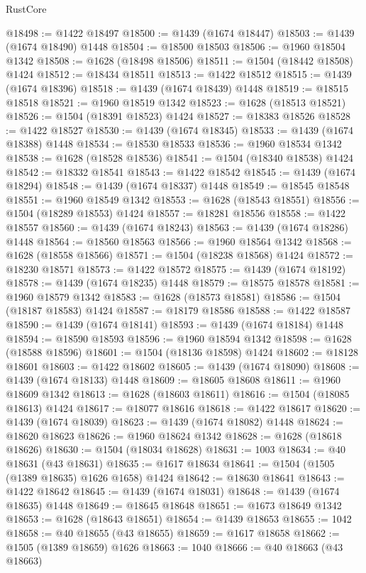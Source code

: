 \begin{lexlean}{RustCore}
\begin{coremodule}
@18498 := @1422 @18497
@18500 := @1439 (@1674 @18447)
@18503 := @1439 (@1674 @18490) @1448
@18504 := @18500 @18503
@18506 := @1960 @18504 @1342
@18508 := @1628 (@18498 @18506)
@18511 := @1504 (@18442 @18508) @1424
@18512 := @18434 @18511
@18513 := @1422 @18512
@18515 := @1439 (@1674 @18396)
@18518 := @1439 (@1674 @18439) @1448
@18519 := @18515 @18518
@18521 := @1960 @18519 @1342
@18523 := @1628 (@18513 @18521)
@18526 := @1504 (@18391 @18523) @1424
@18527 := @18383 @18526
@18528 := @1422 @18527
@18530 := @1439 (@1674 @18345)
@18533 := @1439 (@1674 @18388) @1448
@18534 := @18530 @18533
@18536 := @1960 @18534 @1342
@18538 := @1628 (@18528 @18536)
@18541 := @1504 (@18340 @18538) @1424
@18542 := @18332 @18541
@18543 := @1422 @18542
@18545 := @1439 (@1674 @18294)
@18548 := @1439 (@1674 @18337) @1448
@18549 := @18545 @18548
@18551 := @1960 @18549 @1342
@18553 := @1628 (@18543 @18551)
@18556 := @1504 (@18289 @18553) @1424
@18557 := @18281 @18556
@18558 := @1422 @18557
@18560 := @1439 (@1674 @18243)
@18563 := @1439 (@1674 @18286) @1448
@18564 := @18560 @18563
@18566 := @1960 @18564 @1342
@18568 := @1628 (@18558 @18566)
@18571 := @1504 (@18238 @18568) @1424
@18572 := @18230 @18571
@18573 := @1422 @18572
@18575 := @1439 (@1674 @18192)
@18578 := @1439 (@1674 @18235) @1448
@18579 := @18575 @18578
@18581 := @1960 @18579 @1342
@18583 := @1628 (@18573 @18581)
@18586 := @1504 (@18187 @18583) @1424
@18587 := @18179 @18586
@18588 := @1422 @18587
@18590 := @1439 (@1674 @18141)
@18593 := @1439 (@1674 @18184) @1448
@18594 := @18590 @18593
@18596 := @1960 @18594 @1342
@18598 := @1628 (@18588 @18596)
@18601 := @1504 (@18136 @18598) @1424
@18602 := @18128 @18601
@18603 := @1422 @18602
@18605 := @1439 (@1674 @18090)
@18608 := @1439 (@1674 @18133) @1448
@18609 := @18605 @18608
@18611 := @1960 @18609 @1342
@18613 := @1628 (@18603 @18611)
@18616 := @1504 (@18085 @18613) @1424
@18617 := @18077 @18616
@18618 := @1422 @18617
@18620 := @1439 (@1674 @18039)
@18623 := @1439 (@1674 @18082) @1448
@18624 := @18620 @18623
@18626 := @1960 @18624 @1342
@18628 := @1628 (@18618 @18626)
@18630 := @1504 (@18034 @18628)
@18631 := 1003
@18634 := @40 @18631 (@43 @18631)
@18635 := @1617 @18634
@18641 := @1504 (@1505 (@1389 @18635) @1626 @1658) @1424
@18642 := @18630 @18641
@18643 := @1422 @18642
@18645 := @1439 (@1674 @18031)
@18648 := @1439 (@1674 @18635) @1448
@18649 := @18645 @18648
@18651 := @1673 @18649 @1342
@18653 := @1628 (@18643 @18651)
@18654 := @1439 @18653
@18655 := 1042
@18658 := @40 @18655 (@43 @18655)
@18659 := @1617 @18658
@18662 := @1505 (@1389 @18659) @1626
@18663 := 1040
@18666 := @40 @18663 (@43 @18663)

\end{coremodule}
\end{lexlean}
